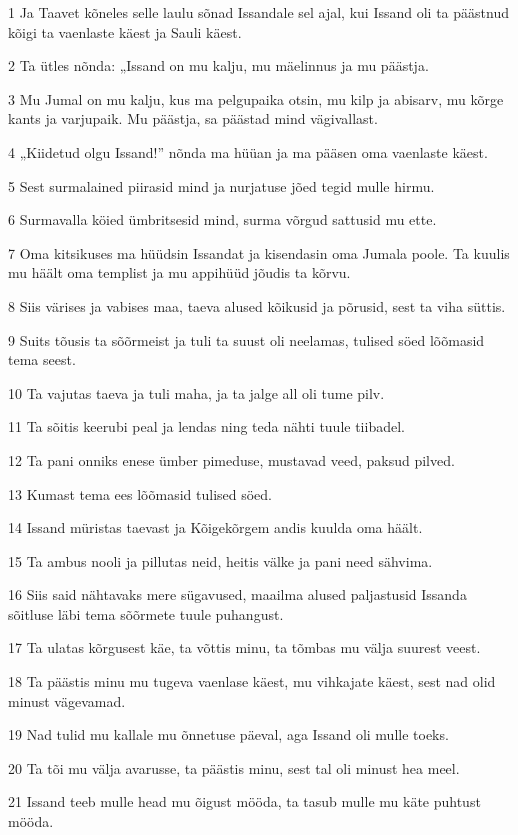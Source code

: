 \par 1 Ja Taavet kõneles selle laulu sõnad Issandale sel ajal, kui Issand oli ta päästnud kõigi ta vaenlaste käest ja Sauli käest.
\par 2 Ta ütles nõnda: „Issand on mu kalju, mu mäelinnus ja mu päästja.
\par 3 Mu Jumal on mu kalju, kus ma pelgupaika otsin, mu kilp ja abisarv, mu kõrge kants ja varjupaik. Mu päästja, sa päästad mind vägivallast.
\par 4 „Kiidetud olgu Issand!” nõnda ma hüüan ja ma pääsen oma vaenlaste käest.
\par 5 Sest surmalained piirasid mind ja nurjatuse jõed tegid mulle hirmu.
\par 6 Surmavalla köied ümbritsesid mind, surma võrgud sattusid mu ette.
\par 7 Oma kitsikuses ma hüüdsin Issandat ja kisendasin oma Jumala poole. Ta kuulis mu häält oma templist ja mu appihüüd jõudis ta kõrvu.
\par 8 Siis värises ja vabises maa, taeva alused kõikusid ja põrusid, sest ta viha süttis.
\par 9 Suits tõusis ta sõõrmeist ja tuli ta suust oli neelamas, tulised söed lõõmasid tema seest.
\par 10 Ta vajutas taeva ja tuli maha, ja ta jalge all oli tume pilv.
\par 11 Ta sõitis keerubi peal ja lendas ning teda nähti tuule tiibadel.
\par 12 Ta pani onniks enese ümber pimeduse, mustavad veed, paksud pilved.
\par 13 Kumast tema ees lõõmasid tulised söed.
\par 14 Issand müristas taevast ja Kõigekõrgem andis kuulda oma häält.
\par 15 Ta ambus nooli ja pillutas neid, heitis välke ja pani need sähvima.
\par 16 Siis said nähtavaks mere sügavused, maailma alused paljastusid Issanda sõitluse läbi tema sõõrmete tuule puhangust.
\par 17 Ta ulatas kõrgusest käe, ta võttis minu, ta tõmbas mu välja suurest veest.
\par 18 Ta päästis minu mu tugeva vaenlase käest, mu vihkajate käest, sest nad olid minust vägevamad.
\par 19 Nad tulid mu kallale mu õnnetuse päeval, aga Issand oli mulle toeks.
\par 20 Ta tõi mu välja avarusse, ta päästis minu, sest tal oli minust hea meel.
\par 21 Issand teeb mulle head mu õigust mööda, ta tasub mulle mu käte puhtust mööda.
